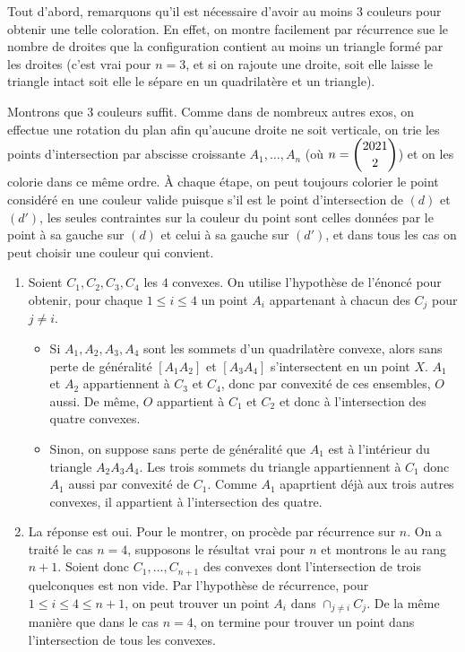 \begin{sol}
Tout d'abord, remarquons qu'il est nécessaire d'avoir au moins $3$ couleurs pour obtenir une telle coloration. En effet, on montre facilement par récurrence sue le nombre de droites que la configuration contient au moins un triangle formé par les droites (c'est vrai pour $n=3$, et si on rajoute une droite, soit elle laisse le triangle intact soit elle le sépare en un quadrilatère et un triangle).

Montrons que $3$ couleurs suffit. Comme dans de nombreux autres exos, on effectue une rotation du plan afin qu'aucune droite ne soit verticale, on trie les points d'intersection par abscisse croissante $A_1,\ldots,A_n$ (où $n=\dbinom{2021}2$) et on les colorie dans ce même ordre. À chaque étape, on peut toujours colorier le point considéré en une couleur valide puisque s'il est le point d'intersection de $(d)$ et $(d')$, les seules contraintes sur la couleur du point sont celles données par le point à sa gauche sur $(d)$ et celui à sa gauche sur $(d')$, et dans tous les cas on peut choisir une couleur qui convient.
\end{sol}


\begin{sol}
\begin{enumerate}
    \item Soient $C_1,C_2,C_3,C_4$ les $4$ convexes. On utilise l'hypothèse de l'énoncé pour obtenir, pour chaque $1\le i \le 4$ un point $A_i$ appartenant à chacun des $C_j$ pour $j\ne i$.
    \begin{itemize}
        \item Si $A_1,A_2,A_3,A_4$ sont les sommets d'un quadrilatère convexe, alors sans perte de généralité $[A_1A_2]$ et $[A_3A_4]$ s'intersectent en un point $X$. $A_1$ et $A_2$ appartiennent à $C_3$ et $C_4$, donc par convexité de ces ensembles, $O$ aussi. De même, $O$ appartient à $C_1$ et $C_2$ et donc à l'intersection des quatre convexes.
        \item Sinon, on suppose sans perte de généralité que $A_1$ est à l'intérieur du triangle $A_2A_3A_4$. Les trois sommets du triangle appartiennent à $C_1$ donc $A_1$ aussi par convexité de $C_1$. Comme $A_1$ apaprtient déjà aux trois autres convexes, il appartient à l'intersection des quatre.
    \end{itemize}

    \item La réponse est oui. Pour le montrer, on procède par récurrence sur $n$. On a traité le cas $n=4$, supposons le résultat vrai pour $n$ et montrons le au rang $n+1$. Soient donc $C_1,\ldots,C_{n+1}$ des convexes dont l'intersection de trois quelconques est non vide. Par l'hypothèse de récurrence, pour $1\le i\le 4\le n+1$, on peut trouver un point $A_i$ dans $\cap_{j\ne i}C_j$. De la même manière que dans le cas $n=4$, on termine pour trouver un point dans l'intersection de tous les convexes.
\end{enumerate}
\end{sol}


